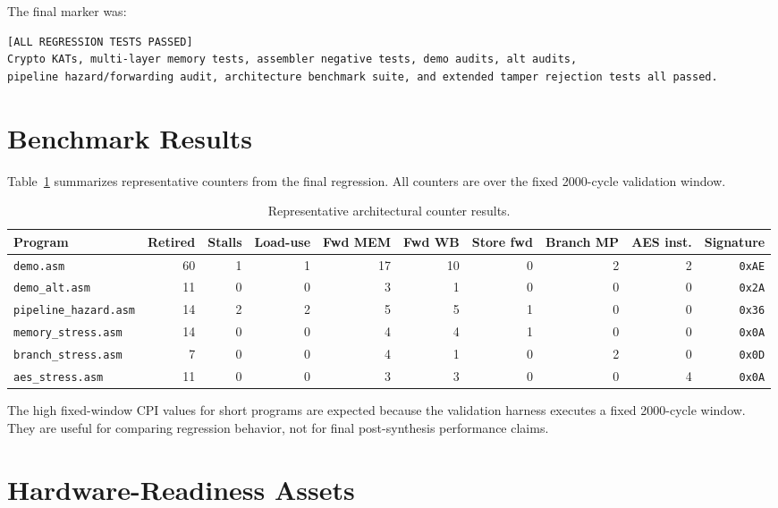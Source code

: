 \documentclass[conference]{IEEEtran}
\begin{document}
The final marker was:

\begin{lstlisting}
[ALL REGRESSION TESTS PASSED]
Crypto KATs, multi-layer memory tests, assembler negative tests, demo audits, alt audits,
pipeline hazard/forwarding audit, architecture benchmark suite, and extended tamper rejection tests all passed.
\end{lstlisting}

\section{Benchmark Results}

Table~\ref{tab:counters} summarizes representative counters from the final regression. All counters are over the fixed 2000-cycle validation window.

\begin{table}[!t]
\caption{Representative architectural counter results.}
\label{tab:counters}
\centering
\scriptsize
\begin{tabular}{@{}lrrrrrrrrr@{}}
\toprule
Program & Retired & Stalls & Load-use & Fwd MEM & Fwd WB & Store fwd & Branch MP & AES inst. & Signature \\
\midrule
\texttt{demo.asm} & 60 & 1 & 1 & 17 & 10 & 0 & 2 & 2 & \texttt{0xAE} \\
\texttt{demo\_alt.asm} & 11 & 0 & 0 & 3 & 1 & 0 & 0 & 0 & \texttt{0x2A} \\
\texttt{pipeline\_hazard.asm} & 14 & 2 & 2 & 5 & 5 & 1 & 0 & 0 & \texttt{0x36} \\
\texttt{memory\_stress.asm} & 14 & 0 & 0 & 4 & 4 & 1 & 0 & 0 & \texttt{0x0A} \\
\texttt{branch\_stress.asm} & 7 & 0 & 0 & 4 & 1 & 0 & 2 & 0 & \texttt{0x0D} \\
\texttt{aes\_stress.asm} & 11 & 0 & 0 & 3 & 3 & 0 & 0 & 4 & \texttt{0x0A} \\
\bottomrule
\end{tabular}
\end{table}

The high fixed-window CPI values for short programs are expected because the validation harness executes a fixed 2000-cycle window. They are useful for comparing regression behavior, not for final post-synthesis performance claims.

\section{Hardware-Readiness Assets}
\end{document}

